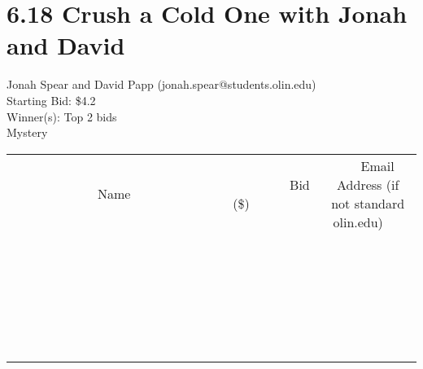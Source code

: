 \documentclass[11pt]{article}
\begin{document}
\section*{6.18 Crush a Cold One with Jonah and David}
Jonah Spear and David Papp (jonah.spear@students.olin.edu) \\
Starting Bid: \$4.2 \\
Winner(s): 
Top 2 bids \\
Mystery \\[6ex]
\begin{tabular}{c c c}
~~~~~~~~~~~~~Name~~~~~~~~~~~~~ & ~~~~~~~~~Bid (\$)~~~~~~~~~ & ~~~Email Address (if not standard olin.edu)~~~ \\
 & & \\
\hline
 & & \\
\hline
 & & \\
\hline
 & & \\
\hline
 & & \\
\hline
 & & \\
\hline
 & & \\
\hline
 & & \\
\hline
 & & \\
\hline
 & & \\
\hline
 & & \\
\hline
 & & \\
\hline
 & & \\
\hline
 & & \\
\hline
 & & \\
\hline
 & & \\
\hline
 & & \\
\hline
 & & \\
\hline
 & & \\
\hline
 & & \\
\hline
 & & \\
\hline
 & & \\
\hline
 & & \\
\hline
 & & \\
\hline
 & & \\
\hline
 & & \\
\hline
\end{tabular}
\clearpage
\end{document}
